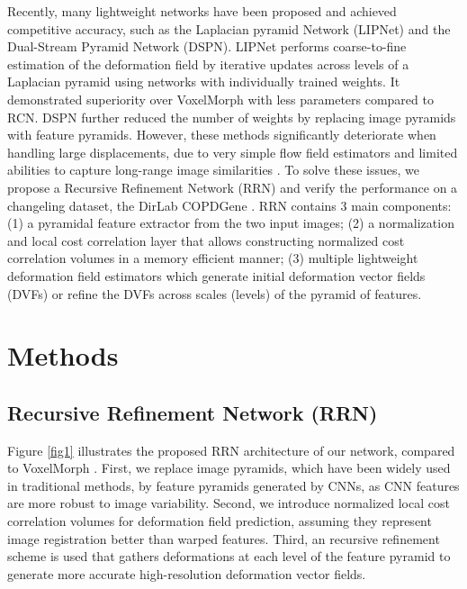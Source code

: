 \documentclass[runningheads]{llncs}
\begin{document}
Recently, many lightweight networks have been proposed and achieved competitive accuracy, such as the Laplacian pyramid Network (LIPNet) \cite{mokLargeDeformationDiffeomorphic2020} and the Dual-Stream Pyramid Network (DSPN)\cite{huDualStreamPyramidRegistration2019}. LIPNet performs  coarse-to-fine estimation of the deformation field by iterative updates across levels of a Laplacian pyramid using networks with individually trained weights.  It demonstrated superiority over VoxelMorph with less parameters compared to RCN. DSPN further reduced the number of weights by replacing image pyramids with feature pyramids. However, these methods significantly deteriorate when handling large displacements, due to very simple flow field estimators and limited abilities to capture long-range image similarities \cite{devosDeepLearningFramework2018} \cite{fuDeepLearningMedical2020}. 
To solve these issues, we propose a Recursive Refinement Network (RRN) and verify the performance on a changeling dataset, the DirLab COPDGene \cite{castilloReferenceDatasetDeformable2013} \cite{castilloFrameworkEvaluationDeformable2009}. 
RRN contains 3 main components: (1) a pyramidal feature extractor from the two input images; (2) a normalization and local cost correlation layer that allows constructing normalized cost correlation volumes in a memory efficient manner; (3) multiple lightweight deformation field estimators which generate initial deformation vector fields (DVFs) or refine the DVFs across scales (levels) of the pyramid of features. 

\section{Methods}

\subsection{Recursive Refinement Network (RRN)}
Figure \ref{fig1} illustrates the proposed RRN architecture of our network, compared to VoxelMorph \cite{balakrishnanVoxelMorphLearningFramework2019}. First, we replace image pyramids, which have been widely used in traditional methods, by feature pyramids generated by CNNs, as CNN features are more robust to image variability. Second, we introduce normalized local cost correlation volumes for deformation field prediction, assuming they represent image registration better than warped features. Third, an recursive refinement scheme is used that gathers deformations at each level of the feature pyramid  to generate more accurate high-resolution deformation vector fields. 
\end{document}
